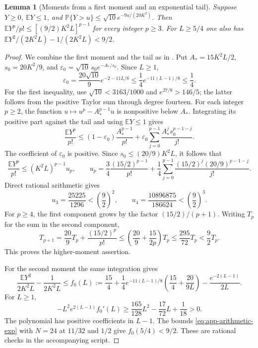 \documentclass[11pt,a4paper]{article}
\numberwithin{equation}{section}
\newtheorem{lemma}[theorem]{Lemma}
\begin{document}
\begin{lemma}[Moments from a first moment and an exponential tail]
\label{app:upper-scalar-mgf}
Suppose $Y\ge0$, $\mathbb EY\le1$, and
$\mathbb P\{Y>u\}\le\sqrt{10}e^{-9u/(20K^2)}$.
Then $\mathbb EY^p/p!\le[(9/2)K^2L]^{p-1}$ for every integer $p\ge3$.
For $L\ge5/4$ one also has
$\mathbb EY^2/(2K^2L)-1/(2K^2L)<9/2$.
\end{lemma}
\begin{proof}
We combine the first moment and the tail as in
\cite[Lemma~2.1]{jeong2022subgaussian}.
Put
$A_*=15K^2L/2$, $s_0=20K^2/9$, and
$\varepsilon_0=\sqrt{10}\,s_0e^{-A_*/s_0}$.
Since $L\ge1$,
\[
 \varepsilon_0=\frac{20\sqrt{10}}9e^{-2-11L/8}
 \le\frac14 e^{-11(L-1)/8}\le\frac14.
\]
For the first inequality, use $\sqrt{10}<3163/1000$ and
$e^{27/8}>146/5$; the latter follows from the positive Taylor sum
through degree fourteen.
For each integer $p\ge2$, the function
$u\mapsto u^p-A_*^{p-1}u$ is nonpositive below $A_*$.
Integrating its positive part against the tail and using $\mathbb EY\le1$ gives
\begin{equation}\label{eq:app-tail-moment-integration}
 \frac{\mathbb EY^p}{p!}
 \le(1-\varepsilon_0)\frac{A_*^{p-1}}{p!}
   +\varepsilon_0\sum_{j=0}^{p-1}\frac{A_*^j s_0^{p-1-j}}{j!}.
\end{equation}
The coefficient of $\varepsilon_0$ is positive. Since
$s_0\le(20/9)K^2L$, it follows that
\[
 \frac{\mathbb EY^p}{p!}\le(K^2L)^{p-1}u_p,
 \qquad
 u_p=\frac34\frac{(15/2)^{p-1}}{p!}
     +\frac14\sum_{j=0}^{p-1}
       \frac{(15/2)^j(20/9)^{p-1-j}}{j!}.
\]
Direct rational arithmetic gives
\[
 u_3=\frac{25225}{1296}<\left(\frac92\right)^2,
 \qquad
 u_4=\frac{10896875}{186624}<\left(\frac92\right)^3.
\]
For $p\ge4$, the first component grows by the factor $(15/2)/(p+1)$.
Writing $T_p$ for the sum in the second component,
\[
 T_{p+1}=\frac{20}{9}T_p+\frac{(15/2)^p}{p!}
 \le\left(\frac{20}{9}+\frac{15}{2p}\right)T_p
 \le\frac{295}{72}T_p<\frac92T_p.
\]
This proves the higher-moment assertion.

For the second moment the same integration gives
\[
 \frac{\mathbb EY^2}{2K^2L}-\frac1{2K^2L}
 \le f_0(L):=\frac{15}{4}+\frac14e^{-11(L-1)/8}
       \left(\frac{15}{4}+\frac{20}{9L}\right)
       -\frac{e^{-2(L-1)}}{2L}.
\]
For $L\ge1$,
\[
 -L^2e^{2(L-1)}f_0'(L)
 \ge\frac{165}{128}L^2-\frac{17}{72}L+\frac1{18}>0.
\]
The polynomial has positive coefficients in $L-1$.
The bounds \eqref{eq:app-arithmetic-exp} with $N=24$ at $11/32$ and
$1/2$ give $f_0(5/4)<9/2$.
These are rational checks in the accompanying script.
\end{proof}
\end{document}
